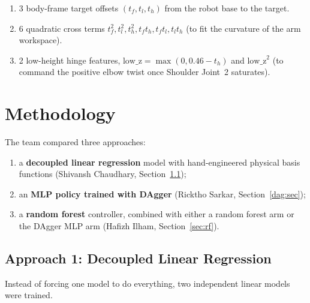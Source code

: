 \documentclass[conference]{IEEEtran}
\begin{document}
\begin{itemize}
\begin{enumerate}
        \item 3 body-frame target offsets $(t_f, t_l, t_h)$ from the robot base to the target.
        \item 6 quadratic cross terms $t_f^2, t_l^2, t_h^2, t_f t_h, t_f t_l, t_l t_h$ (to fit the curvature of the arm workspace).
        \item 2 low-height hinge features, $\text{low\_z} = \max(0, 0.46 - t_h)$ and $\text{low\_z}^2$ (to command the positive elbow twist once Shoulder Joint~2 saturates).
    \end{enumerate}
\end{itemize}


\section{Methodology}
\label{sec:method}

The team compared three approaches:
\begin{enumerate}
    \item a \textbf{decoupled linear regression} model with hand-engineered physical basis functions (Shivansh Chaudhary, Section~\ref{sec:linear});
    \item an \textbf{MLP policy trained with DAgger} (Ricktho Sarkar, Section~\ref{dag:sec});
    \item a \textbf{random forest} controller, combined with either a random forest arm or the DAgger MLP arm (Hafizh Ilham, Section~\ref{sec:rf}).
\end{enumerate}

\subsection{Approach 1: Decoupled Linear Regression}
\label{sec:linear}
Instead of forcing one model to do everything, two independent linear models were trained.
\end{document}

